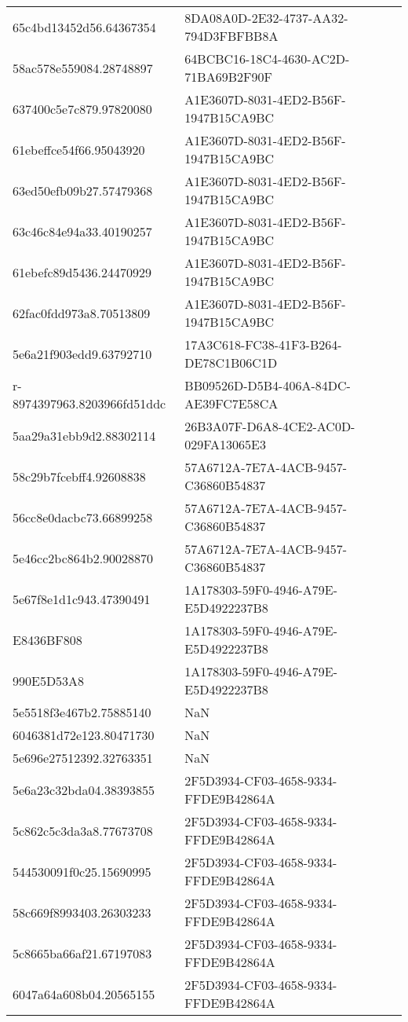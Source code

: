 \begin{tabular}{ll}
65c4bd13452d56.64367354 & 8DA08A0D-2E32-4737-AA32-794D3FBFBB8A \\
58ac578e559084.28748897 & 64BCBC16-18C4-4630-AC2D-71BA69B2F90F \\
637400c5e7c879.97820080 & A1E3607D-8031-4ED2-B56F-1947B15CA9BC \\
61ebeffce54f66.95043920 & A1E3607D-8031-4ED2-B56F-1947B15CA9BC \\
63ed50efb09b27.57479368 & A1E3607D-8031-4ED2-B56F-1947B15CA9BC \\
63c46c84e94a33.40190257 & A1E3607D-8031-4ED2-B56F-1947B15CA9BC \\
61ebefc89d5436.24470929 & A1E3607D-8031-4ED2-B56F-1947B15CA9BC \\
62fac0fdd973a8.70513809 & A1E3607D-8031-4ED2-B56F-1947B15CA9BC \\
5e6a21f903edd9.63792710 & 17A3C618-FC38-41F3-B264-DE78C1B06C1D \\
r-8974397963.8203966fd51ddc & BB09526D-D5B4-406A-84DC-AE39FC7E58CA \\
5aa29a31ebb9d2.88302114 & 26B3A07F-D6A8-4CE2-AC0D-029FA13065E3 \\
58c29b7fcebff4.92608838 & 57A6712A-7E7A-4ACB-9457-C36860B54837 \\
56cc8e0dacbc73.66899258 & 57A6712A-7E7A-4ACB-9457-C36860B54837 \\
5e46cc2bc864b2.90028870 & 57A6712A-7E7A-4ACB-9457-C36860B54837 \\
5e67f8e1d1c943.47390491 & 1A178303-59F0-4946-A79E-E5D4922237B8 \\
E8436BF808 & 1A178303-59F0-4946-A79E-E5D4922237B8 \\
990E5D53A8 & 1A178303-59F0-4946-A79E-E5D4922237B8 \\
5e5518f3e467b2.75885140 & NaN \\
6046381d72e123.80471730 & NaN \\
5e696e27512392.32763351 & NaN \\
5e6a23c32bda04.38393855 & 2F5D3934-CF03-4658-9334-FFDE9B42864A \\
5c862c5c3da3a8.77673708 & 2F5D3934-CF03-4658-9334-FFDE9B42864A \\
544530091f0c25.15690995 & 2F5D3934-CF03-4658-9334-FFDE9B42864A \\
58c669f8993403.26303233 & 2F5D3934-CF03-4658-9334-FFDE9B42864A \\
5c8665ba66af21.67197083 & 2F5D3934-CF03-4658-9334-FFDE9B42864A \\
6047a64a608b04.20565155 & 2F5D3934-CF03-4658-9334-FFDE9B42864A \\

\end{tabular}
